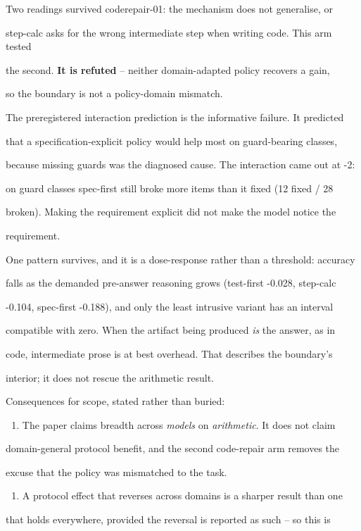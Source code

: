 \documentclass[11pt]{article}
\begin{document}
Two readings survived coderepair-01: the mechanism does not generalise, or

step-calc asks for the wrong intermediate step when writing code. This arm tested

the second. {\bf It is refuted} -- neither domain-adapted policy recovers a gain,

so the boundary is not a policy-domain mismatch.


The preregistered interaction prediction is the informative failure. It predicted

that a specification-explicit policy would help most on guard-bearing classes,

because missing guards was the diagnosed cause. The interaction came out at -2:

on guard classes spec-first still broke more items than it fixed (12 fixed / 28

broken). Making the requirement explicit did not make the model notice the

requirement.


One pattern survives, and it is a dose-response rather than a threshold: accuracy

falls as the demanded pre-answer reasoning grows (test-first -0.028, step-calc

-0.104, spec-first -0.188), and only the least intrusive variant has an interval

compatible with zero. When the artifact being produced {\it is} the answer, as in

code, intermediate prose is at best overhead. That describes the boundary's

interior; it does not rescue the arithmetic result.


Consequences for scope, stated rather than buried:


\begin{enumerate}\item The paper claims breadth across {\it models} on {\it arithmetic}. It does not claim
\end{enumerate}
domain-general protocol benefit, and the second code-repair arm removes the

excuse that the policy was mismatched to the task.

\begin{enumerate}\item A protocol effect that reverses across domains is a sharper result than one
\end{enumerate}
that holds everywhere, provided the reversal is reported as such -- so this is
\end{document}
